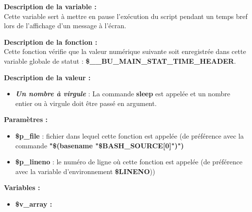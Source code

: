 \documentclass[a4paper,10pt]{article}
\begin{document}
\begin{justify}
    \textbf{Description de la variable :}\\
    Cette variable sert à mettre en pause l'exécution du script pendant un temps bref lors de l'affichage d'un message à l'écran.
\end{justify}

\begin{justify}
    \textbf{Description de la fonction :}\\
    Cette fonction vérifie que la valeur numérique suivante soit enregistrée dans cette variable globale de statut : \textbf{\color{orange}\$\_\_BU\_MAIN\_STAT\_TIME\_HEADER}.
\end{justify}

\begin{justify}
    \textbf{Description de la valeur :}

    \begin{itemize}
        \item \textbf{\textit{Un nombre à virgule}} : La commande \textbf{\color{gray}sleep} est appelée et un nombre entier ou à virgule doit être passé en argument.
    \end{itemize}

\end{justify}

\begin{justify}
    \textbf{Paramètres :}

    \begin{itemize}
        \item \color{orange}\textbf{\$p\_file}\color{white} : fichier dans lequel cette fonction est appelée (de préférence avec la commande \textbf{"\$(\color{gray}basename \color{white}"\color{orange}\$BASH\_SOURCE[0]\color{white}")")}\\

        \item \color{orange}\textbf{\$p\_lineno}\color{white} : le numéro de ligne où cette fonction est appelée (de préférence avec la variable d'environnement \textbf{\color{orange}\$LINENO}))
    \end{itemize}
\end{justify}

\begin{justify}
    \textbf{Variables :}

    \begin{itemize}
        \item \textbf{\color{orange}\$v\_array\color{white} :}
    \end{itemize}
\end{justify}
\end{document}
